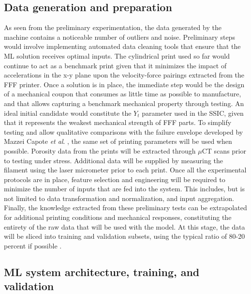 \documentclass[main.tex]{subfiles}
\begin{document}
\subsection{Data generation and preparation}\label{ssec:datag}

As seen from the preliminary experimentation, the data generated by the machine contains a noticeable number of outliers and noise. Preliminary steps would involve implementing automated data cleaning tools that ensure that the ML solution receives optimal inputs. The cylindrical print used so far would continue to act as a benchmark print given that it minimizes the impact of accelerations in the x-y plane upon the velocity-force pairings extracted from the FFF printer. Once a solution is in place, the immediate step would be the design of a mechanical coupon that consumes as little time as possible to manufacture, and that allows capturing a benchmark mechanical property through testing. An ideal initial candidate would constitute the $Y_t$ parameter used in the SSIC, given that it represents the weakest mechanical strength of FFF parts. To simplify testing and allow qualitative comparisons with the failure envelope developed by Mazzei Capote \emph{et al}. \cite{MazzeiCapote2019}, the same set of printing parameters will be used when possible. Porosity data from the prints will be extracted through $\mu$CT scans prior to testing under stress. Additional data will be supplied by measuring the filament using the laser micrometer prior to each print. Once all the experimental protocols are in place, feature selection and engineering will be required to minimize the number of inputs that are fed into the system. This includes, but is not limited to data transformation and normalization, and input aggregation. Finally, the knowledge extracted from these preliminary tests can be extrapolated for additional printing conditions and mechanical responses, constituting the entirety of the raw data that will be used with the model. At this stage, the data will be sliced into training and validation subsets, using the typical ratio of 80-20 percent if possible \cite{Geron2019}.
 
\subsection{ML system architecture, training, and validation}\label{ssec:MLA}
\end{document}
